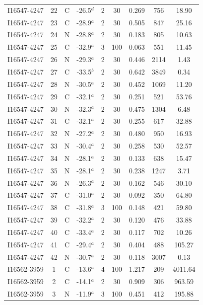 \begin{table}
\begin{tabular}{ccccccccc}
I16547-4247 & 22 & C & -26.5$^{d}$ & 2 & 30 & 0.269 & 756 & 18.90 \\
I16547-4247 & 23 & C & -28.9$^{a}$ & 2 & 30 & 0.505 & 847 & 25.16 \\
I16547-4247 & 24 & N & -28.8$^{a}$ & 2 & 30 & 0.183 & 805 & 10.63 \\
I16547-4247 & 25 & C & -32.9$^{a}$ & 3 & 100 & 0.063 & 551 & 11.45 \\
I16547-4247 & 26 & N & -29.3$^{a}$ & 2 & 30 & 0.446 & 2114 & 1.43 \\
I16547-4247 & 27 & C & -33.5$^{b}$ & 2 & 30 & 0.642 & 3849 & 0.34 \\
I16547-4247 & 28 & N & -30.5$^{a}$ & 2 & 30 & 0.452 & 1069 & 11.20 \\
I16547-4247 & 29 & C & -32.1$^{a}$ & 2 & 30 & 0.251 & 521 & 53.76 \\
I16547-4247 & 30 & N & -32.3$^{a}$ & 2 & 30 & 0.475 & 1304 & 6.48 \\
I16547-4247 & 31 & C & -32.1$^{a}$ & 2 & 30 & 0.255 & 617 & 32.88 \\
I16547-4247 & 32 & N & -27.2$^{a}$ & 2 & 30 & 0.480 & 950 & 16.93 \\
I16547-4247 & 33 & N & -30.4$^{a}$ & 2 & 30 & 0.258 & 530 & 52.57 \\
I16547-4247 & 34 & N & -28.1$^{a}$ & 2 & 30 & 0.133 & 638 & 15.47 \\
I16547-4247 & 35 & N & -28.1$^{a}$ & 2 & 30 & 0.238 & 1247 & 3.71 \\
I16547-4247 & 36 & N & -26.3$^{a}$ & 2 & 30 & 0.162 & 546 & 30.10 \\
I16547-4247 & 37 & C & -31.0$^{a}$ & 2 & 30 & 0.092 & 350 & 64.80 \\
I16547-4247 & 38 & C & -31.8$^{a}$ & 3 & 100 & 0.148 & 421 & 59.80 \\
I16547-4247 & 39 & C & -32.2$^{a}$ & 2 & 30 & 0.120 & 476 & 33.88 \\
I16547-4247 & 40 & C & -33.4$^{a}$ & 2 & 30 & 0.117 & 702 & 10.26 \\
I16547-4247 & 41 & C & -29.4$^{a}$ & 2 & 30 & 0.404 & 488 & 105.27 \\
I16547-4247 & 42 & N & -30.7$^{a}$ & 2 & 30 & 0.118 & 3007 & 0.13 \\
I16562-3959 & 1 & C & -13.6$^{a}$ & 4 & 100 & 1.217 & 209 & 4011.64 \\
I16562-3959 & 2 & C & -14.1$^{a}$ & 2 & 30 & 0.909 & 306 & 963.59 \\
I16562-3959 & 3 & N & -11.9$^{a}$ & 3 & 100 & 0.451 & 412 & 195.88 \\

\end{tabular}
\end{table}
